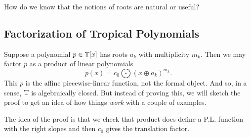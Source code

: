 \documentclass[12pt]{memoir}
\theoremstyle{definition}
\begin{document}
How do we know that the notions of roots are natural or useful?

\subsection{Factorization of Tropical Polynomials}

Suppose a polynomial $p\in\mathbb{T}[x]$ has roots $a_k$ with multiplicity $m_k$. Then we may factor $p$ as a product of linear polynomials 
$$p(x)=c_0\bigodot(x\oplus a_k)^{m_k}.$$
This $p$ is the affine piecewise-linear function, not the formal object. And so, in a sense, $\mathbb{T}$ is algebraically closed. But instead of proving this, we will sketch the proof to get an idea of how things \emph{work} with a couple of examples.\par 
The idea of the proof is that we check that product does define a P.L. function with the right slopes and then $c_0$ gives the translation factor.
\end{document}
